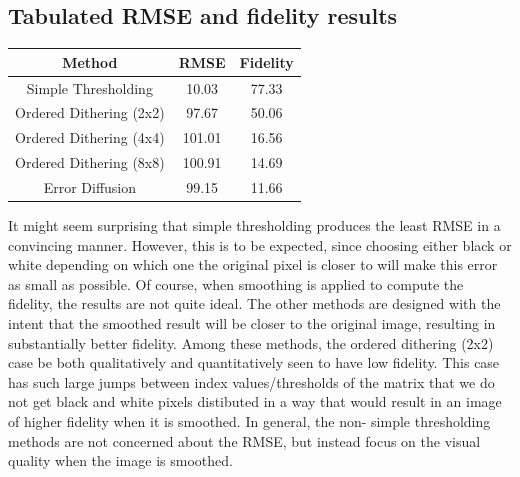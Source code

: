 \documentclass{article}
\begin{document}
\subsection{Tabulated RMSE and fidelity results}
\begin{center}
    \begin{tabular}{|c|c|c|}
        \hline
        \textbf{Method} & \textbf{RMSE} & \textbf{Fidelity} \\
        \hline
        Simple Thresholding & 10.03 & 77.33 \\
        \hline
        Ordered Dithering (2x2) & 97.67 & 50.06 \\
        \hline
        Ordered Dithering (4x4) & 101.01 & 16.56 \\
        \hline
        Ordered Dithering (8x8) & 100.91 & 14.69 \\
        \hline
        Error Diffusion & 99.15 & 11.66 \\
        \hline
    \end{tabular}
\end{center}
It might seem surprising that simple thresholding produces the least RMSE in a convincing manner. However, this is to be expected, since choosing either black or white depending on which one the original pixel is closer to will make this error as small as possible. Of course, when smoothing is applied to compute the fidelity, the results are not quite ideal. The other methods are designed with the intent that the smoothed result will be closer to the original image, resulting in substantially better fidelity. Among these methods, the ordered dithering (2x2) case be both qualitatively and quantitatively seen to have low fidelity. This case has such large jumps between index values/thresholds of the matrix that we do not get black and white pixels distibuted in a way that would result in an image of higher fidelity when it is smoothed. In general, the non- simple thresholding methods are not concerned about the RMSE, but instead focus on the visual quality when the image is smoothed.
\end{document}
